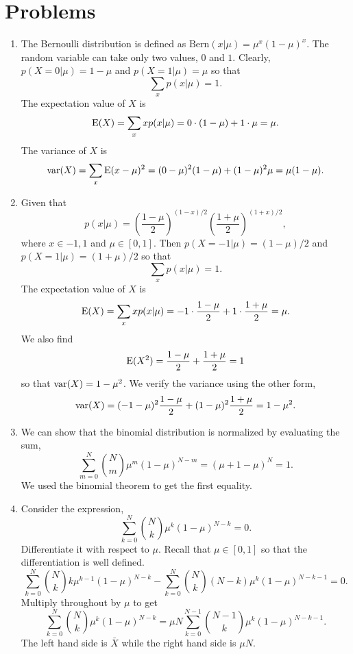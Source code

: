 \section{Problems}\label{c2p}
\begin{enumerate}
\item The Bernoulli distribution is defined as $\mathrm{Bern}(x|\mu) = \mu^x(1 - \mu)^x$. The 
random variable can take only two values, $0$ and $1$. Clearly, $p(X=0|\mu) = 1 - \mu$ and 
$p(X=1|\mu) = \mu$ so that
\[
\sum_x p(x|\mu) = 1.
\]
The expectation value of $X$ is
\[
\operatorname{E}(X) = \sum_x xp(x|\mu) = 0\cdot(1 - \mu) + 1\cdot\mu = \mu.
\]
The variance of $X$ is
\[
\operatorname{var}(X) = \sum_x \operatorname{E}(x - \mu)^2 = (0 - \mu)^2(1 - \mu) + (1 - \mu)^2\mu = \mu(1 - \mu).
\]

\item Given that
\[
p(x|\mu) = \left(\frac{1-\mu}{2}\right)^{(1-x)/2}\left(\frac{1+\mu}{2}\right)^{(1+x)/2},
\]
where $x \in {-1, 1}$ and $\mu \in [0, 1]$. Then $p(X=-1|\mu) = (1 - \mu)/2$ and $p(X=1|\mu)
= (1 + \mu)/2$ so that 
\[
\sum_x p(x|\mu) = 1.
\]
The expectation value of $X$ is
\[
\operatorname{E}(X) = \sum_x xp(x|\mu) = -1\cdot\frac{1 - \mu}{2} + 1\cdot\frac{1 + \mu}{2} = \mu.
\]
We also find
\[
\operatorname{E}(X^2) = \frac{1 - \mu}{2} + \frac{1 + \mu}{2} = 1
\]
so that $\operatorname{var}(X) = 1 - \mu^2$. We verify the variance using the other form,
\[
\operatorname{var}(X) = (-1 - \mu)^2\frac{1 - \mu}{2} + (1 - \mu)^2\frac{1 + \mu}{2} = 1 - \mu^2.
\]

\item We can show that the binomial distribution is normalized by evaluating the sum,
\[
\sum_{m=0}^N\binom{N}{m}\mu^m(1 - \mu)^{N-m} = (\mu + 1 - \mu)^N = 1.
\]
We used the binomial theorem to get the first equality.

\item Consider the expression,
\[
\sum_{k=0}^N \binom{N}{k}\mu^k(1 - \mu)^{N-k} = 0.
\]
Differentiate it with respect to $\mu$. Recall that $\mu \in [0, 1]$ so that the differentiation 
is well defined.
\[
\sum_{k=0}^N\binom{N}{k}k\mu^{k-1}(1 - \mu)^{N-k} - \sum_{k=0}^N\binom{N}{k}(N-k)\mu^k(1 - \mu)^{N-k-1} = 0.
\]
Multiply throughout by $\mu$ to get
\[
\sum_{k=0}^N\binom{N}{k}\mu^k(1 - \mu)^{N-k} = \mu N\sum_{k=0}^{N-1}\binom{N-1}{k}\mu^k(1 - \mu)^{N-k-1}.
\]
The left hand side is $\bar{X}$ while the right hand side is $\mu N$.


\end{enumerate}
